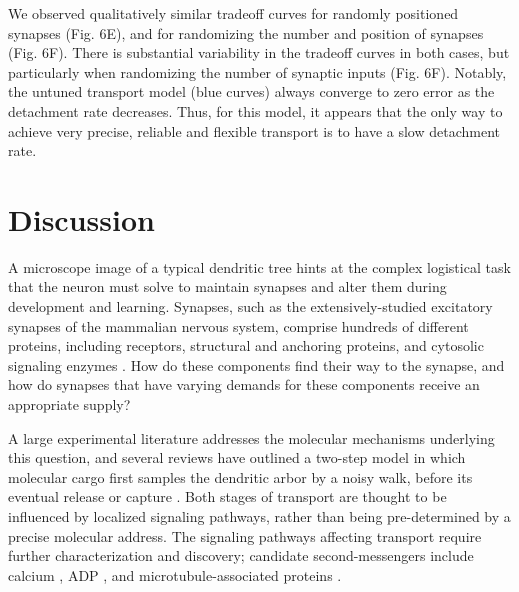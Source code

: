 \documentclass[11pt]{wlpeerj}
\begin{document}
We observed qualitatively similar tradeoff curves for randomly positioned synapses (Fig. 6E), and for randomizing the number and position of synapses (Fig. 6F). There is substantial variability in the tradeoff curves in both cases, but particularly when randomizing the number of synaptic inputs (Fig. 6F). Notably, the untuned transport model (blue curves) always converge to zero error as the detachment rate decreases. Thus, for this model, it appears that the only way to achieve very precise, reliable and flexible transport is to have a slow detachment rate.

\section*{Discussion}

A microscope image of a typical dendritic tree hints at the complex logistical task that the neuron must solve to maintain synapses and alter them during development and learning.
Synapses, such as the extensively-studied excitatory synapses of the mammalian nervous system, comprise hundreds of different proteins, including receptors, structural and anchoring proteins, and cytosolic signaling enzymes \citep{Liu2014,Lassek2015}.
How do these components find their way to the synapse, and how do synapses that have varying demands for these components receive an appropriate supply?

A large experimental literature addresses the molecular mechanisms underlying this question, and several reviews have outlined a two-step model in which molecular cargo first samples the dendritic arbor by a noisy walk, before its eventual release or capture \citep{Welte2004,Buxbaum_2014b,Buxbaum2015}.
Both stages of transport are thought to be influenced by localized signaling pathways, rather than being pre-determined by a precise molecular address.
The signaling pathways affecting transport require further characterization and discovery; candidate second-messengers include calcium \citep{Wang_2009}, ADP \citep{Mironov_2007}, and microtubule-associated proteins \citep{Soundararajan_2014}.
\end{document}
